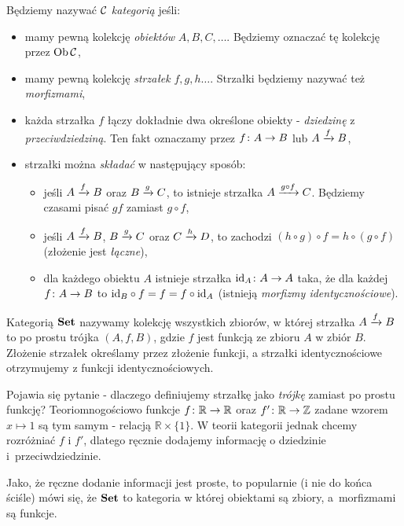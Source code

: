 \begin{defn}
  Będziemy nazywać $\C$ \emph{kategorią} jeśli:
    \begin{itemize}
      \item mamy pewną kolekcję \emph{obiektów} $A, B, C, \dots$. Będziemy oznaczać tę kolekcję przez $\Ob \C$,
      \item mamy pewną kolekcję \emph{strzałek} $f, g, h\dots$. Strzałki będziemy nazywać też \emph{morfizmami},
      \item każda strzałka $f$ łączy dokładnie dwa określone obiekty - \emph{dziedzinę} z \emph{przeciwdziedziną}. Ten fakt oznaczamy przez $\morph fAB$ lub $\morpharr fAB$,
      \item strzałki można \emph{składać} w następujący sposób:
        \begin{itemize}
          \item jeśli $\morpharr fAB$ oraz $\morpharr gBC$, to istnieje strzałka $\morpharr {g\circ f}AC$. Będziemy czasami pisać $gf$ zamiast $g\circ f$,
          \item jeśli $\morpharr fAB$, $\morpharr gBC$ oraz $\morpharr h CD$, to zachodzi $(h\circ g)\circ f = h\circ (g\circ f)$ (złożenie jest \emph{łączne}),
          \item dla każdego obiektu $A$ istnieje strzałka $\morph{\id A}AA$ taka, że dla każdej $\morph fAB$ to $\id B \circ f = f = f \circ \id A$ (istnieją \emph{morfizmy identycznościowe}).
        \end{itemize}
    \end{itemize}
\end{defn}

\begin{exmp}
  \label{exmp:set}
  Kategorią $\Set$ nazywamy kolekcję wszystkich zbiorów, w której strzałka $\morpharr fAB$ to po prostu trójka $(A, f, B)$, gdzie $f$ jest funkcją ze zbioru $A$ w zbiór $B$. Złożenie strzałek określamy przez złożenie funkcji, a strzałki identycznościowe otrzymujemy z funkcji identycznościowych.

  Pojawia się pytanie - dlaczego definiujemy strzałkę jako \emph{trójkę} zamiast po prostu funkcję? Teoriomnogościowo funkcje $\morph f{\mathbb R}{\mathbb R}$ oraz $\morph {f'}{\mathbb R}{\mathbb Z}$ zadane wzorem $x\mapsto 1$ są tym samym - relacją $\mathbb R\times \{1\}$. W teorii kategorii jednak chcemy rozróżniać $f$ i $f'$, dlatego ręcznie dodajemy informację o dziedzinie i~przeciwdziedzinie.

  Jako, że ręczne dodanie informacji jest proste, to popularnie (i nie do końca ściśle) mówi się, że $\Set$ to kategoria w której obiektami są zbiory, a~morfizmami są funkcje.
\end{exmp}

